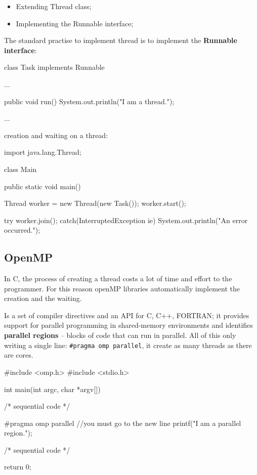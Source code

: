 \begin{itemize}
    \item Extending Thread class;
    \item Implementing the Runnable interface;
\end{itemize}

The standard practise to implement thread is to implement the \textbf{Runnable interface}:

\begin{codeInJava}
class Task implements Runnable{

    ...
    
    public void run(){
        System.out.println("I am a thread.");
    }

    ...
}

\end{codeInJava}

creation and waiting on a thread:

\begin{codeInJava}
import java.lang.Thread;

class Main {

    public static void main() {

        Thread worker = new Thread(new Task());
        worker.start();

        try{
            worker.join();
        }catch(InterruptedException ie){
            System.out.println("An error occurred.");
        }
        
    }
}
\end{codeInJava}

\newpage
\subsection{OpenMP}

In C, the process of creating a thread costs a lot of time and effort to the programmer. For this reason openMP libraries automatically implement the creation and the waiting.

Is a set of compiler directives and an API for C, C++, FORTRAN; it provides support for parallel
programming in shared-memory environments and identifies \textbf{parallel regions} – blocks of code that can run in
parallel. 
All of this only writing a single line: \verb|#pragma omp parallel|, it create as many threads as there are cores.

\begin{codeInC}
#include <omp.h>
#include <stdio.h>

int main(int argc, char *argv[]) {

    /* sequential code */
    
    #pragma omp parallel
    {                           //you must go to the new line
        printf("I am a parallel region.");
    }
    
    
    /* sequential code */
    
    return 0;
}
\end{codeInC}
